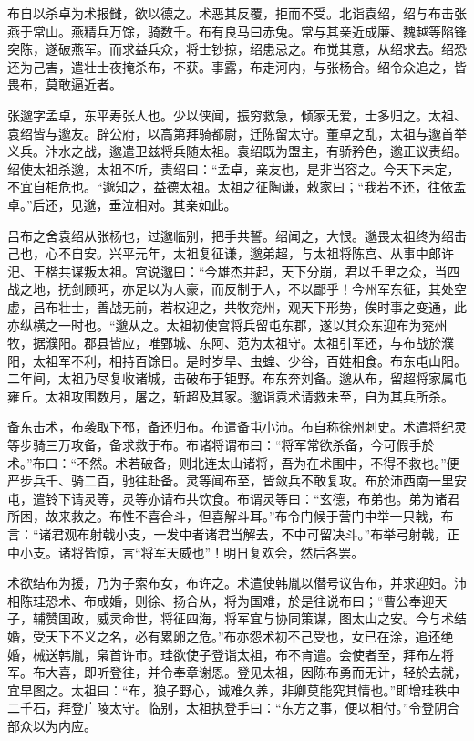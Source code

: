 \documentclass[12pt,UTF8]{ctexbook}
\begin{document}
布自以杀卓为术报雠，欲以德之。术恶其反覆，拒而不受。北诣袁绍，绍与布击张燕于常山。燕精兵万馀，骑数千。布有良马曰赤兔。常与其亲近成廉、魏越等陷锋突陈，遂破燕军。而求益兵众，将士钞掠，绍患忌之。布觉其意，从绍求去。绍恐还为己害，遣壮士夜掩杀布，不获。事露，布走河内，与张杨合。绍令众追之，皆畏布，莫敢逼近者。

张邈字孟卓，东平寿张人也。少以侠闻，振穷救急，倾家无爱，士多归之。太祖、袁绍皆与邈友。辟公府，以高第拜骑都尉，迁陈留太守。董卓之乱，太祖与邈首举义兵。汴水之战，邈遣卫兹将兵随太祖。袁绍既为盟主，有骄矜色，邈正议责绍。绍使太祖杀邈，太祖不听，责绍曰：“孟卓，亲友也，是非当容之。今天下未定，不宜自相危也。“邈知之，益德太祖。太祖之征陶谦，敕家曰；“我若不还，往依孟卓。”后还，见邈，垂泣相对。其亲如此。

吕布之舍袁绍从张杨也，过邈临别，把手共誓。绍闻之，大恨。邈畏太祖终为绍击己也，心不自安。兴平元年，太祖复征谦，邈弟超，与太祖将陈宫、从事中郎许汜、王楷共谋叛太祖。宫说邈曰：“今雄杰并起，天下分崩，君以千里之众，当四战之地，抚剑顾眄，亦足以为人豪，而反制于人，不以鄙乎！今州军东征，其处空虚，吕布壮士，善战无前，若权迎之，共牧兖州，观天下形势，俟时事之变通，此亦纵横之一时也。“邈从之。太祖初使宫将兵留屯东郡，遂以其众东迎布为兖州牧，据濮阳。郡县皆应，唯鄄城、东阿、范为太祖守。太祖引军还，与布战於濮阳，太祖军不利，相持百馀日。是时岁旱、虫蝗、少谷，百姓相食。布东屯山阳。二年间，太祖乃尽复收诸城，击破布于钜野。布东奔刘备。邈从布，留超将家属屯雍丘。太祖攻围数月，屠之，斩超及其家。邈诣袁术请救未至，自为其兵所杀。

备东击术，布袭取下邳，备还归布。布遣备屯小沛。布自称徐州刺史。术遣将纪灵等步骑三万攻备，备求救于布。布诸将谓布曰：“将军常欲杀备，今可假手於术。”布曰：“不然。术若破备，则北连太山诸将，吾为在术围中，不得不救也。”便严步兵千、骑二百，驰往赴备。灵等闻布至，皆敛兵不敢复攻。布於沛西南一里安屯，遣铃下请灵等，灵等亦请布共饮食。布谓灵等曰：“玄德，布弟也。弟为诸君所困，故来救之。布性不喜合斗，但喜解斗耳。”布令门候于营门中举一只戟，布言：“诸君观布射戟小支，一发中者诸君当解去，不中可留决斗。”布举弓射戟，正中小支。诸将皆惊，言“将军天威也”！明日复欢会，然后各罢。

术欲结布为援，乃为子索布女，布许之。术遣使韩胤以僣号议告布，并求迎妇。沛相陈珪恐术、布成婚，则徐、扬合从，将为国难，於是往说布曰；“曹公奉迎天子，辅赞国政，威灵命世，将征四海，将军宜与协同策谋，图太山之安。今与术结婚，受天下不义之名，必有累卵之危。”布亦怨术初不己受也，女已在涂，追还绝婚，械送韩胤，枭首许市。珪欲使子登诣太祖，布不肯遣。会使者至，拜布左将军。布大喜，即听登往，并令奉章谢恩。登见太祖，因陈布勇而无计，轻於去就，宜早图之。太祖曰：“布，狼子野心，诚难久养，非卿莫能究其情也。”即增珪秩中二千石，拜登广陵太守。临别，太祖执登手曰：“东方之事，便以相付。”令登阴合部众以为内应。
\end{document}
